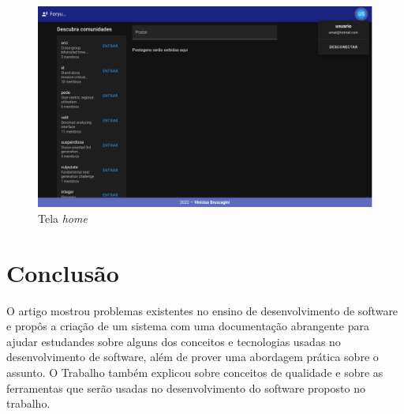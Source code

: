 \documentclass[12pt]{article}
\begin{document}
\begin{figure}[H]
    \centering
    \includegraphics[width=1\textwidth]{prints/home.png}
    \caption{Tela \textit{home}}\label{fig:home}
\end{figure}

\section{Conclusão}

O artigo mostrou problemas existentes no ensino de desenvolvimento de software e propôs
a criação de um sistema com uma documentação abrangente para ajudar estudandes sobre alguns dos
conceitos e tecnologias usadas no desenvolvimento de software, além de prover uma abordagem prática
sobre o assunto. O Trabalho também explicou sobre conceitos de qualidade e sobre as ferramentas que
serão usadas no desenvolvimento do software proposto no trabalho.


\end{document}
